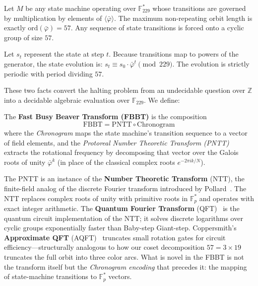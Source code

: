 \begin{result}
\label{res:closure}
Let $M$ be any state machine operating over
$\mathbb{F}_{229}^*$ whose transitions are governed by
multiplication by elements of $\langle\bar\varphi\rangle$.
The maximum non-repeating orbit length is exactly
$\mathrm{ord}(\bar\varphi) = 57$. Any sequence of state
transitions is forced onto a cyclic group of size $57$.
\end{result}

\begin{result}
\label{res:phase}
Let $s_t$ represent the state at step $t$. Because transitions
map to powers of the generator, the state evolution is:
$s_t \equiv s_0 \cdot \bar\varphi^t \pmod{229}$.
The evolution is strictly periodic with period dividing $57$.
\end{result}

These two facts convert the halting problem from an undecidable
question over $\mathbb{Z}$ into a decidable algebraic evaluation
over $\mathbb{F}_{229}$. We define:

\begin{definition}
\label{def:fbbt}
The \textbf{Fast Busy Beaver Transform (FBBT)} is the composition
\[
\mathrm{FBBT} = \mathrm{PNTT} \circ \mathrm{Chronogram}
\]
where the \emph{Chronogram} maps the state machine's transition
sequence to a vector of field elements, and the \emph{Protoreal
Number Theoretic Transform (PNTT)} extracts the rotational frequency
by decomposing that vector over the Galois roots of unity
$\bar\varphi^{k}$ (in place of the classical complex roots
$e^{-2\pi i k/N}$).
\end{definition}

\begin{remark}
\label{rem:ntt_qft}
The PNTT is an instance of the \textbf{Number Theoretic Transform} (NTT), the finite-field analog of the discrete Fourier transform introduced by Pollard~\cite{pollard1971}. The NTT replaces complex roots of unity with primitive roots in $\mathbb{F}_p^*$ and operates with exact integer arithmetic. The \textbf{Quantum Fourier Transform} (QFT)~\cite{shor1994} is the quantum circuit implementation of the NTT; it solves discrete logarithms over cyclic groups exponentially faster than Baby-step Giant-step. Coppersmith's \textbf{Approximate QFT} (AQFT)~\cite{coppersmith1994} truncates small rotation gates for circuit efficiency---structurally analogous to how our coset decomposition $57 = 3 \times 19$ truncates the full orbit into three color arcs. What is novel in the FBBT is not the transform itself but the \emph{Chronogram encoding} that precedes it: the mapping of state-machine transitions to $\mathbb{F}_p^*$ vectors.
\end{remark}

